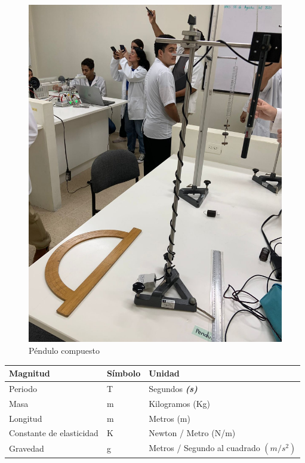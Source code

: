 \documentclass[twocolumn, 12pt]{article}
\newcommand{\bolditalic}[1]{\textbf{\textit{#1}}}
\begin{document}
\begin{figure}[H]
    \begin{center}
        \includegraphics[width=0.6\linewidth]{./Images/IMAGEN_3.jpeg}
    \end{center}
    \caption{Péndulo compuesto}
\end{figure}

\begin{table}[H]
    \begin{tabularx}{\linewidth}{|>{\centering\arraybackslash}X|>{\centering\arraybackslash}X|>{\centering\arraybackslash}X|}
        \hline
        \rowcolor{LigthGray} Magnitud                     & Símbolo & Unidad                                   \\\hline
        Periodo                                           & T       & Segundos \bolditalic{(s)}                \\\hline
        \rowcolor{LigthGrayPlus} Masa                     & m       & Kilogramos (Kg)                          \\\hline
        Longitud                                          & m       & Metros (m)                               \\\hline
        \rowcolor{LigthGrayPlus} Constante de elasticidad & K       & Newton / Metro (N/m)                     \\\hline
        Gravedad                                          & g       & Metros / Segundo al cuadrado $(m/s^{2})$ \\\hline
    \end{tabularx}
\end{table}
\end{document}
